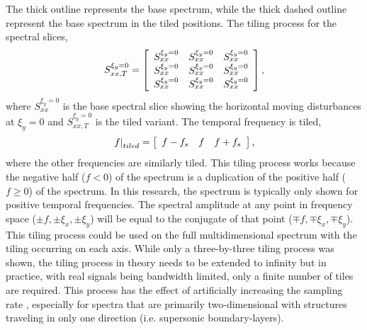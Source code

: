 The thick outline represents the base spectrum, while the thick dashed outline represent the base spectrum in the tiled positions.
The tiling process for the spectral slices,
\begin{equation}
  S_{xx,T}^{\xi_y=0} = \left[
    \begin{array}{c c c}
      S_{xx}^{\xi_y=0} & S_{xx}^{\xi_y=0} & S_{xx}^{\xi_y=0} \\
      S_{xx}^{\xi_y=0} & S_{xx}^{\xi_y=0} & S_{xx}^{\xi_y=0} \\
      S_{xx}^{\xi_y=0} & S_{xx}^{\xi_y=0} & S_{xx}^{\xi_y=0}
    \end{array}
  \right] \textrm{,}
\end{equation}
where $S_{xx}^{\xi_y=0}$ is the base spectral slice showing the horizontal moving disturbances at $\xi_y=0$ and $S_{xx,T}^{\xi_y=0}$ is the tiled variant.
The temporal frequency is tiled,
\begin{equation}
  \left. f\right|_{tiled} = \left[
    \begin{array}{c c c}
      f-f_s & f & f+f_s
    \end{array}
  \right] \textrm{,}
\end{equation}
where the other frequencies are similarly tiled.
This tiling process works because the negative half ($f<0$) of the spectrum is a duplication of the positive half ($f\ge0$) of the spectrum.
In this research, the spectrum is typically only shown for positive temporal frequencies.
The spectral amplitude at any point in frequency space ($\pm f,\pm\xi_x,\pm\xi_y$) will be equal to the conjugate of that point ($\mp f,\mp\xi_x,\mp\xi_y$).
This tiling process could be used on the full multidimensional spectrum with the tiling occurring on each axis.
While only a three-by-three tiling process was shown, the tiling process in theory needs to be extended to infinity but in practice, with real signals being bandwidth limited, only a finite number of tiles are required.
This process has the effect of artificially increasing the sampling rate \cite{Lynch-2021-DygYkEGU}, especially for spectra that are primarily two-dimensional with structures traveling in only one direction (i.e. supersonic boundary-layers).

